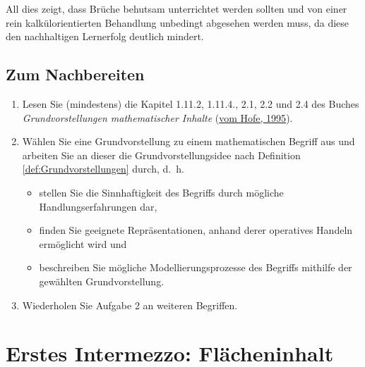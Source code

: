 \documentclass[
  ngerman,
]{scrbook}
\providecommand{\tightlist}{%
  \setlength{\itemsep}{0pt}\setlength{\parskip}{0pt}}
\theoremstyle{definition}
\theoremstyle{definition}
\theoremstyle{definition}
\theoremstyle{definition}
\theoremstyle{remark}
\begin{document}
All dies zeigt, dass Brüche behutsam unterrichtet werden sollten und von einer rein kalkülorientierten Behandlung unbedingt abgesehen werden muss, da diese den nachhaltigen Lernerfolg deutlich mindert.

\hypertarget{grundvorstellungen-nachbereitung}{%
\section{Zum Nachbereiten}\label{grundvorstellungen-nachbereitung}}

\begin{enumerate}
\def\labelenumi{\arabic{enumi}.}
\tightlist
\item
  Lesen Sie (mindestens) die Kapitel 1.11.2, 1.11.4., 2.1, 2.2 und 2.4 des Buches \emph{Grundvorstellungen mathematischer Inhalte} (\protect\hyperlink{ref-Hofe:1995}{vom Hofe, 1995}).
\item
  Wählen Sie eine Grundvorstellung zu einem mathematischen Begriff aus und arbeiten Sie an dieser die Grundvorstellungsidee nach Definition \ref{def:Grundvorstellungen} durch, d.~h.

  \begin{itemize}
  \tightlist
  \item
    stellen Sie die Sinnhaftigkeit des Begriffs durch mögliche Handlungserfahrungen dar,\\
  \item
    finden Sie geeignete Repräsentationen, anhand derer operatives Handeln ermöglicht wird und\\
  \item
    beschreiben Sie mögliche Modellierungsprozesse des Begriffs mithilfe der gewählten Grundvorstellung.
  \end{itemize}
\item
  Wiederholen Sie Aufgabe 2 an weiteren Begriffen.
\end{enumerate}

\hypertarget{erstes-intermezzo-flaecheninhalt}{%
\chapter{Erstes Intermezzo: Flächeninhalt}\label{erstes-intermezzo-flaecheninhalt}}
\end{document}
